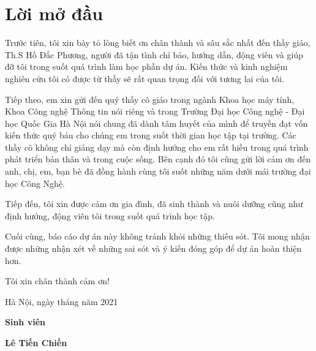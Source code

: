 \chapter*{Lời mở đầu}

Trước tiên, tôi xin bày tỏ lòng biết ơn chân thành và sâu sắc nhất đến thầy giáo, Th.S Hồ Đắc Phương, người đã tận tình chỉ bảo, hướng dẫn, động viên và giúp đỡ tôi trong suốt quá trình làm học phần dự án. Kiến thức và kinh nghiệm nghiên cứu tôi có được từ thầy sẽ rất quan trọng đối với tương lai của tôi.

Tiếp theo, em xin gửi đến quý thầy cô giáo trong ngành Khoa học máy tính, Khoa Công nghệ Thông tin nói riêng và trong Trường Đại học Công nghệ - Đại học Quốc Gia Hà Nội nói chung đã dành tâm huyết của mình để truyền đạt vốn kiến thức quý báu cho chúng em trong suốt thời gian học tập tại trường. Các thầy cô không chỉ giảng dạy mà còn định hướng cho em rất hiều trong quá trình phát triển bản thân và trong cuộc sống. Bên cạnh đó tôi cũng gửi lời cảm ơn đến anh, chị, em, bạn bè đã đồng hành cùng tôi suốt những năm dưới mái trường đại học Công Nghệ.

Tiếp đến, tôi xin được cảm ơn gia đình, đã sinh thành và nuôi dưỡng cũng như định hướng, động viên tôi trong suốt quá trình học tập.

Cuối cùng, báo cáo dự án này không tránh khỏi những thiếu sót. Tôi mong nhận được những nhận xét về những sai sót và ý kiến đóng góp để dự án hoàn thiện hơn.

Tôi xin chân thành cảm ơn!

\begin{flushright}
Hà Nội, ngày tháng năm 2021

\textbf{Sinh viên}

\bigskip
\bigskip

\textbf{Lê Tiến Chiến}
\end{flushright}
